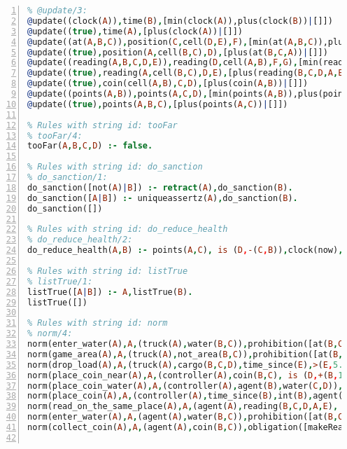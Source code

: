 \documentclass[11pt]{article}\usepackage[utf8]{inputenc}\usepackage{geometry}
\begin{document}
\lstset{breaklines=true}\begin{lstlisting}[language=Prolog, numbers=left]
% Rules with string id: @update
% @update/3:
@update((clock(A)),time(B),[min(clock(A)),plus(clock(B))|[]])
@update((true),time(A),[plus(clock(A))|[]])
@update((at(A,B,C)),position(C,cell(D,E),F),[min(at(A,B,C)),plus(at(D,E,C))|[]])
@update((true),position(A,cell(B,C),D),[plus(at(B,C,A))|[]])
@update((reading(A,B,C,D,E)),reading(D,cell(A,B),F,G),[min(reading(A,B,C,D,E)),plus(reading(A,B,F,D,G))|[]])
@update((true),reading(A,cell(B,C),D,E),[plus(reading(B,C,D,A,E))|[]])
@update((true),coin(cell(A,B),C,D),[plus(coin(A,B))|[]])
@update((points(A,B)),points(A,C,D),[min(points(A,B)),plus(points(A,D))|[]])
@update((true),points(A,B,C),[plus(points(A,C))|[]])

% Rules with string id: tooFar
% tooFar/4:
tooFar(A,B,C,D) :- false.

% Rules with string id: do_sanction
% do_sanction/1:
do_sanction([not(A)|B]) :- retract(A),do_sanction(B).
do_sanction([A|B]) :- uniqueassertz(A),do_sanction(B).
do_sanction([])

% Rules with string id: do_reduce_health
% do_reduce_health/2:
do_reduce_health(A,B) :- points(A,C), is (D,-(C,B)),clock(now),@external(geoSenseMW,write(points(A,E,D),-1.0),F).

% Rules with string id: listTrue
% listTrue/1:
listTrue([A|B]) :- A,listTrue(B).
listTrue([])

% Rules with string id: norm
% norm/4:
norm(enter_water(A),A,(truck(A),water(B,C)),prohibition([at(B,C,A)|[]],[reduce(A,300.0)|[]]))
norm(game_area(A),A,(truck(A),not_area(B,C)),prohibition([at(B,C,A)|[]],[reduce(A,500.0)|[]]))
norm(drop_load(A),A,(truck(A),cargo(B,C,D),time_since(E),>(E,5.0)),obligation([cargo(E)|[]],+(now,15.0),[reduce(A,400.0)|[]]))
norm(place_coin_near(A),A,(controller(A),coin(B,C), is (D,+(B,1.0)), is (E,+(C,1.0)),gameArea(B,C)),prohibition([coin(D,E)|[]],[reduce(A,200.0)|[]]))
norm(place_coin_water(A),A,(controller(A),agent(B),water(C,D)),prohibition([coin(C,D,B)|[]],[reduce(A,300.0)|[]]))
norm(place_coin(A),A,(controller(A),time_since(B),int(B),agent(C)),obligation([coin(C)|[]],+(now,15.0),[reduce(A,100.0)|[]]))
norm(read_on_the_same_place(A),A,(agent(A),reading(B,C,D,A,E), is (F,+(E,1.0))),prohibition([reading(B,C,A)|[]],[reduce(A,300.0)|[]]))
norm(enter_water(A),A,(agent(A),water(B,C)),prohibition([at(B,C,A)|[]],[reduce(A,300.0)|[]]))
norm(collect_coin(A),A,(agent(A),coin(B,C)),obligation([makeReading(B,C)|[]],+(now,15.0),[reduce(A,400.0)|[]]))


\end{lstlisting}
\end{document}
